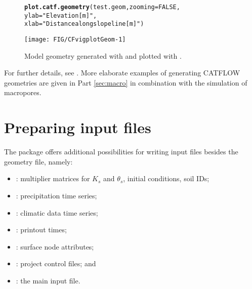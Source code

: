 \documentclass[article,nojss]{jss}\usepackage[]{graphicx}\usepackage[]{xcolor}
\makeatletter
\def\maxwidth{ %
  \ifdim\Gin@nat@width>\linewidth
    \linewidth
  \else
    \Gin@nat@width
  \fi
}
\newcommand{\hlnum}[1]{\textcolor[rgb]{0.686,0.059,0.569}{#1}}%
\newcommand{\hlsng}[1]{\textcolor[rgb]{0.192,0.494,0.8}{#1}}%
\newcommand{\hldef}[1]{\textcolor[rgb]{0.345,0.345,0.345}{#1}}%
\newcommand{\hlkwc}[1]{\textcolor[rgb]{0.333,0.667,0.333}{#1}}%
\newcommand{\hlkwd}[1]{\textcolor[rgb]{0.737,0.353,0.396}{\textbf{#1}}}%
\newenvironment{kframe}{%
 \def\at@end@of@kframe{}%
 \ifinner\ifhmode%
  \def\at@end@of@kframe{\end{minipage}}%
  \begin{minipage}{\columnwidth}%
 \fi\fi%
 \def\FrameCommand##1{\hskip\@totalleftmargin \hskip-\fboxsep
 \colorbox{shadecolor}{##1}\hskip-\fboxsep
     \hskip-\linewidth \hskip-\@totalleftmargin \hskip\columnwidth}%
 \MakeFramed {\advance\hsize-\width
   \@totalleftmargin\z@ \linewidth\hsize
   \@setminipage}}%
 {\par\unskip\endMakeFramed%
 \at@end@of@kframe}
\newenvironment{knitrout}{}{} %
\makeatother
\begin{document}
\begin{figure}[ht]
\begin{center}
\begin{knitrout}
\color{fgcolor}\begin{kframe}
\begin{alltt}
\hlkwd{plot.catf.geometry}\hldef{(test.geom,} \hlkwc{zooming} \hldef{=} \hlnum{FALSE}\hldef{,}
                   \hlkwc{ylab}\hldef{=}\hlsng{"Elevation [m]"}\hldef{,}
                   \hlkwc{xlab}\hldef{=}\hlsng{"Distance along slope line [m]"}\hldef{)}
\end{alltt}
\end{kframe}
\texttt{[image: FIG/CFvigplotGeom-1]} 
\end{knitrout}
\caption{\label{fig:geometry} Model geometry generated with  and plotted with .}
\end{center}
\end{figure}

For further details, see . %
More elaborate examples of generating CATFLOW geometries are given in Part \ref{sec:macro} in combination with the simulation of macropores.

\newpage
\section[Preparing CATFLOW input files]{Preparing  input files}\label{sec:input}

The  package offers additional possibilities for writing input files besides the geometry file, namely:
\begin{itemize} 
  \item {}: multiplier matrices for $K_s$ and $\theta_s$, initial conditions, soil IDs; 
  \item {}: precipitation time series; 
  \item {}: climatic data time series; 
  \item {}: printout times;  
  \item {}: surface node attributes;
  \item {}: project control files; and
  \item {}: the main input file. 
\end{itemize} 
\end{document}
